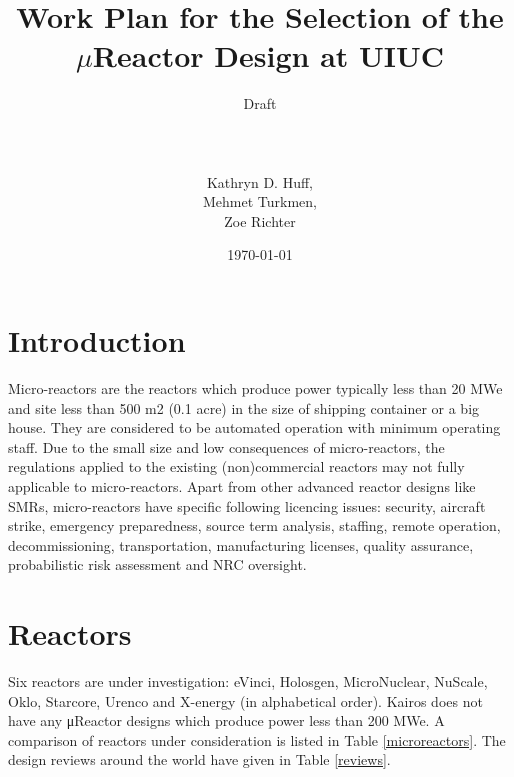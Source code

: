 \documentclass[10pt,a4paper]{article}
\begin{document}
\title{Work Plan for the Selection of the $\mu$Reactor Design at UIUC\\}
\author{Draft\\ \\ \\ \\ Kathryn D. Huff,\\
Mehmet Turkmen,\\
Zoe Richter}
\date{\today}
\maketitle

\pagebreak
\section{Introduction}
Micro-reactors are the reactors which produce power typically less than 20 MWe and site less than 500 m2 (0.1 acre) in the size of shipping container or a big house. They are considered to be automated operation with minimum operating staff. Due to the small size and low consequences of micro-reactors, the regulations applied to the existing (non)commercial reactors may not fully applicable to micro-reactors. Apart from other advanced reactor designs like SMRs, micro-reactors have specific following licencing issues: security, aircraft strike, emergency preparedness, source term analysis, staffing, remote operation, decommissioning, transportation, manufacturing licenses, quality assurance, probabilistic risk assessment and NRC oversight.

\section{Reactors}
Six reactors are under investigation: eVinci, Holosgen, MicroNuclear, NuScale, Oklo, Starcore, Urenco and X-energy (in alphabetical order). Kairos does not have any μReactor designs which produce power less than 200 MWe. A comparison of reactors under consideration is listed in Table \ref{microreactors}. The design reviews around the world have given in Table \ref{reviews}. 
\end{document}
